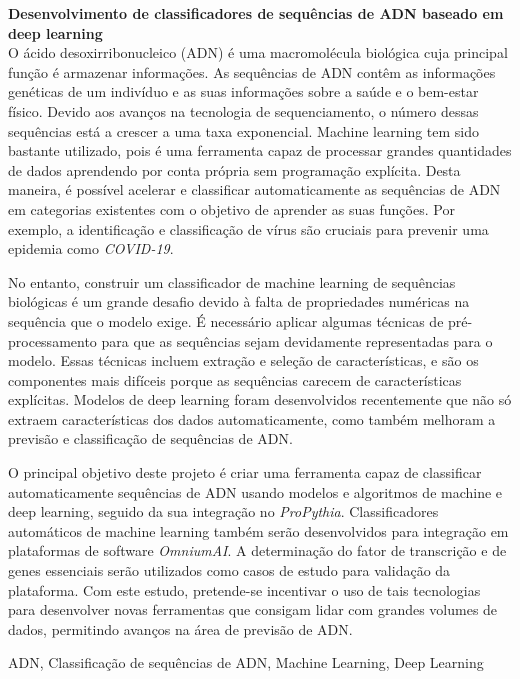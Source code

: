 {\large \textbf{Desenvolvimento de classificadores de sequências de ADN baseado em deep learning}}\\[1ex]
\noindent O ácido desoxirribonucleico (ADN) é uma macromolécula biológica cuja principal função é armazenar informações. As sequências de ADN contêm as informações genéticas de um indivíduo e as suas informações sobre a saúde e o bem-estar físico. Devido aos avanços na tecnologia de sequenciamento, o número dessas sequências está a crescer a uma taxa exponencial. Machine learning tem sido bastante utilizado, pois é uma ferramenta capaz de processar grandes quantidades de dados aprendendo por conta própria sem programação explícita. Desta maneira, é possível acelerar e classificar automaticamente as sequências de ADN em categorias existentes com o objetivo de aprender as suas funções. Por exemplo, a identificação e classificação de vírus são cruciais para prevenir uma epidemia como \emph{COVID-19}.

No entanto, construir um classificador de machine learning de sequências biológicas é um grande desafio devido à falta de propriedades numéricas na sequência que o modelo exige. É necessário aplicar algumas técnicas de pré-processamento para que as sequências sejam devidamente representadas para o modelo. Essas técnicas incluem extração e seleção de características, e são os componentes mais difíceis porque as sequências carecem de características explícitas. Modelos de deep learning foram desenvolvidos recentemente que não só extraem características dos dados automaticamente, como também melhoram a previsão e classificação de sequências de ADN.

O principal objetivo deste projeto é criar uma ferramenta capaz de classificar automaticamente sequências de ADN usando modelos e algoritmos de machine e deep learning, seguido da sua integração no \textit{ProPythia}. Classificadores automáticos de machine learning também serão desenvolvidos para integração em plataformas de software \textit{OmniumAI}. A determinação do fator de transcrição e de genes essenciais serão utilizados como casos de estudo para validação da plataforma. Com este estudo, pretende-se incentivar o uso de tais tecnologias para desenvolver novas ferramentas que consigam lidar com grandes volumes de dados, permitindo avanços na área de previsão de ADN.

\begin{keywords}
ADN, Classificação de sequências de ADN, Machine Learning, Deep Learning
\end{keywords}
